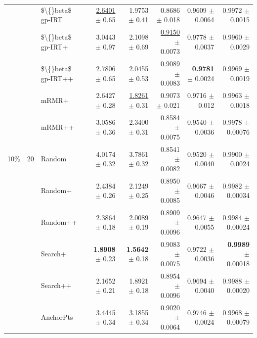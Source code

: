 \begin{longtable}{llp{}rrrrr}
 &  & \$\textbackslash\{\}beta\$ gp-IRT & \underline{2.6401} {\scriptsize $\pm$ 0.65} & 1.9753 {\scriptsize $\pm$ 0.41} & 0.8686 {\scriptsize $\pm$ 0.018} & 0.9609 {\scriptsize $\pm$ 0.0064} & 0.9972 {\scriptsize $\pm$ 0.0015} \\
 &  & \$\textbackslash\{\}beta\$ gp-IRT+ & 3.0443 {\scriptsize $\pm$ 0.97} & 2.1098 {\scriptsize $\pm$ 0.69} & \underline{0.9150} {\scriptsize $\pm$ 0.0073} & 0.9778 {\scriptsize $\pm$ 0.0037} & 0.9960 {\scriptsize $\pm$ 0.0029} \\
 &  & \$\textbackslash\{\}beta\$ gp-IRT++ & 2.7806 {\scriptsize $\pm$ 0.65} & 2.0455 {\scriptsize $\pm$ 0.53} & 0.9089 {\scriptsize $\pm$ 0.0083} & \textbf{0.9781} {\scriptsize $\pm$ 0.0024} & 0.9969 {\scriptsize $\pm$ 0.0019} \\
 &  & mRMR+ & 2.6427 {\scriptsize $\pm$ 0.28} & \underline{1.8261} {\scriptsize $\pm$ 0.31} & 0.9073 {\scriptsize $\pm$ 0.021} & 0.9716 {\scriptsize $\pm$ 0.012} & 0.9963 {\scriptsize $\pm$ 0.0018} \\
 &  & mRMR++ & 3.0586 {\scriptsize $\pm$ 0.36} & 2.3400 {\scriptsize $\pm$ 0.31} & 0.8584 {\scriptsize $\pm$ 0.0075} & 0.9540 {\scriptsize $\pm$ 0.0036} & 0.9978 {\scriptsize $\pm$ 0.00076} \\
\midrule
10\% & 20 & Random & 4.0174 {\scriptsize $\pm$ 0.32} & 3.7861 {\scriptsize $\pm$ 0.32} & 0.8541 {\scriptsize $\pm$ 0.0082} & 0.9520 {\scriptsize $\pm$ 0.0040} & 0.9900 {\scriptsize $\pm$ 0.0024} \\
 &  & Random+ & 2.4384 {\scriptsize $\pm$ 0.26} & 2.1249 {\scriptsize $\pm$ 0.25} & 0.8950 {\scriptsize $\pm$ 0.0085} & 0.9667 {\scriptsize $\pm$ 0.0046} & 0.9982 {\scriptsize $\pm$ 0.00034} \\
 &  & Random++ & 2.3864 {\scriptsize $\pm$ 0.18} & 2.0089 {\scriptsize $\pm$ 0.19} & 0.8909 {\scriptsize $\pm$ 0.0096} & 0.9647 {\scriptsize $\pm$ 0.0055} & 0.9984 {\scriptsize $\pm$ 0.00024} \\
 &  & Search+ & \textbf{1.8908} {\scriptsize $\pm$ 0.23} & \textbf{1.5642} {\scriptsize $\pm$ 0.18} & 0.9083 {\scriptsize $\pm$ 0.0075} & 0.9722 {\scriptsize $\pm$ 0.0036} & \textbf{0.9989} {\scriptsize $\pm$ 0.00018} \\
 &  & Search++ & 2.1652 {\scriptsize $\pm$ 0.21} & 1.8921 {\scriptsize $\pm$ 0.18} & 0.8954 {\scriptsize $\pm$ 0.0096} & 0.9694 {\scriptsize $\pm$ 0.0040} & 0.9988 {\scriptsize $\pm$ 0.00020} \\
 &  & AnchorPts & 3.4445 {\scriptsize $\pm$ 0.34} & 3.1855 {\scriptsize $\pm$ 0.34} & 0.9020 {\scriptsize $\pm$ 0.0064} & 0.9746 {\scriptsize $\pm$ 0.0024} & 0.9968 {\scriptsize $\pm$ 0.00079} \\

\end{longtable}
